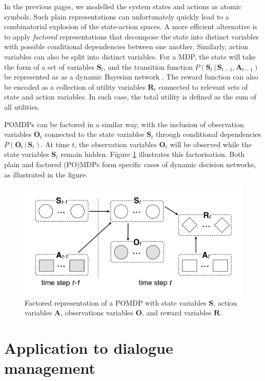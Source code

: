 In the previous pages, we modelled the system states and actions as atomic symbols.  Such plain representations can unfortunately quickly lead to a combinatorial explosion of the state-action spaces. A more efficient alternative is to apply \textit{factored} representations that decompose the state into distinct variables with possible conditional dependencies between one another.  Similarly, action variables can also be split into distinct variables.  For a MDP, the state will take the form of a set of variables $\mathbf{S}_t$, and the transition function $P(\mathbf{S}_t \, | \, \mathbf{S}_{t-1},\mathbf{A}_{t-1})$ be represented as as a dynamic Bayesian network \citep{boutilier1999}. The reward function can also be encoded as a collection of utility variables $\mathbf{R}_t$ connected to relevant sets of state and action variables. In such case, the total utility is defined as the sum of all utilities.

POMDPs can be factored in a similar way, with the inclusion of observation variables $\mathbf{O}_t$ connected to the state variables $\mathbf{S}_t$ through conditional dependencies $P(\mathbf{O}_t \, | \, \mathbf{S}_t)$.  At time $t$, the observation variables $\mathbf{O}_t$ will be observed while the state variables  $\mathbf{S}_t$ remain hidden. Figure \ref{fig:pomdp3} illustrates this factorisation. Both plain and factored (PO)MDPs form specific cases of dynamic decision networks, as illustrated in the figure.

\begin{figure}[h]
\centering
\includegraphics[scale=0.25]{imgs/pomdp3.pdf}
\caption{Factored representation of a POMDP with state variables $\mathbf{S}$, action variables $\mathbf{A}$, observations variables $\mathbf{O}$, and reward variables $\mathbf{R}$. }
\label{fig:pomdp3}
\end{figure}

\section{Application to dialogue management}
\label{sec:application-dm}


